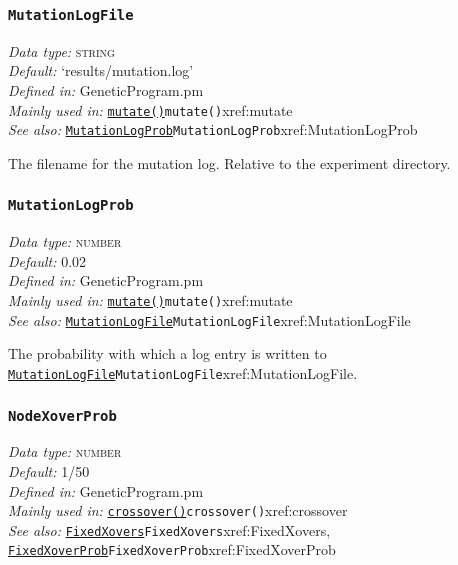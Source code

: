 \documentclass[a4paper]{article}
\begin{document}
\subsubsection{\texttt{MutationLogFile}}\label{xref:MutationLogFile}
\begin{flushleft}
\textit{Data type:} \textsc{string}\\
\textit{Default:} `results/mutation.log'\\
\textit{Defined in:} GeneticProgram.pm\\
\textit{Mainly used in:} \hyperref[no]{\texttt{mutate()}}{\texttt{mutate()}}{xref:mutate}\\
\textit{See also:} \hyperref[no]{\texttt{MutationLogProb}}{\texttt{MutationLogProb}}{xref:MutationLogProb}
\end{flushleft}

The filename for the mutation log.  Relative to the experiment
directory.

\subsubsection{\texttt{MutationLogProb}}\label{xref:MutationLogProb}
\begin{flushleft}
\textit{Data type:} \textsc{number}\\
\textit{Default:} 0.02\\
\textit{Defined in:} GeneticProgram.pm\\
\textit{Mainly used in:} \hyperref[no]{\texttt{mutate()}}{\texttt{mutate()}}{xref:mutate}\\
\textit{See also:} \hyperref[no]{\texttt{MutationLogFile}}{\texttt{MutationLogFile}}{xref:MutationLogFile}
\end{flushleft}

The probability with which a log entry is written to
\hyperref[no]{\texttt{MutationLogFile}}{\texttt{MutationLogFile}}{xref:MutationLogFile}.

\subsubsection{\texttt{NodeXoverProb}}\label{xref:NodeXoverProb}
\begin{flushleft}
\textit{Data type:} \textsc{number}\\
\textit{Default:} 1/50\\
\textit{Defined in:} GeneticProgram.pm\\
\textit{Mainly used in:} \hyperref[no]{\texttt{crossover()}}{\texttt{crossover()}}{xref:crossover}\\
\textit{See also:} \hyperref[no]{\texttt{FixedXovers}}{\texttt{FixedXovers}}{xref:FixedXovers}, \hyperref[no]{\texttt{FixedXoverProb}}{\texttt{FixedXoverProb}}{xref:FixedXoverProb}
\end{flushleft}
\end{document}
